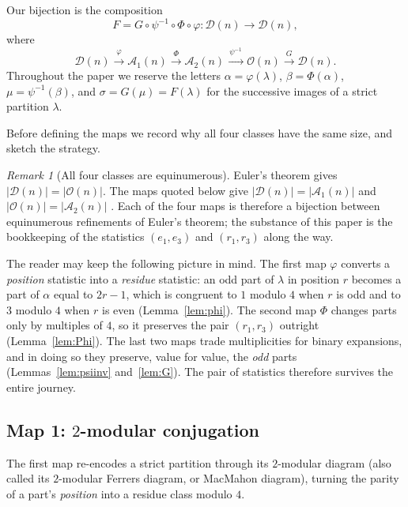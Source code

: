 \documentclass[11pt]{amsart}
\theoremstyle{definition}
\theoremstyle{remark}
\newtheorem{remark}[theorem]{Remark}
\newcommand{\D}{\mathcal D}
\newcommand{\Oparts}{\mathcal O}
\newcommand{\Aone}{\mathcal A_1}
\newcommand{\Atwo}{\mathcal A_2}
\begin{document}
Our bijection is the composition
\[
   F=G\circ \psi^{-1}\circ \Phi\circ \varphi:
   \D(n)\longrightarrow \D(n),
\]
where
\[
   \D(n)\xrightarrow{\ \varphi\ }\Aone(n)
        \xrightarrow{\ \Phi\ }\Atwo(n)
        \xrightarrow{\ \psi^{-1}\ }\Oparts(n)
        \xrightarrow{\ G\ }\D(n).
\]
Throughout the paper we reserve the letters $\alpha=\varphi(\lambda)$, $\beta=\Phi(\alpha)$, $\mu=\psi^{-1}(\beta)$, and $\sigma=G(\mu)=F(\lambda)$ for the successive images of a strict partition $\lambda$.

Before defining the maps we record why all four classes have the same size, and sketch the strategy.

\begin{remark}[All four classes are equinumerous]\label{rem:euler}
Euler's theorem gives $|\D(n)|=|\Oparts(n)|$. The maps quoted below give $|\D(n)|=|\Aone(n)|$ \cite[Lemma 2.2]{CGJL} and $|\Oparts(n)|=|\Atwo(n)|$ \cite[Lemma 2.3]{CGJL}. Each of the four maps is therefore a bijection between equinumerous refinements of Euler's theorem; the substance of this paper is the bookkeeping of the statistics $(e_1,e_3)$ and $(r_1,r_3)$ along the way.
\end{remark}

The reader may keep the following picture in mind. The first map $\varphi$ converts a \emph{position} statistic into a \emph{residue} statistic: an odd part of $\lambda$ in position $r$ becomes a part of $\alpha$ equal to $2r-1$, which is congruent to $1$ modulo $4$ when $r$ is odd and to $3$ modulo $4$ when $r$ is even (Lemma~\ref{lem:phi}). The second map $\Phi$ changes parts only by multiples of $4$, so it preserves the pair $(r_1,r_3)$ outright (Lemma~\ref{lem:Phi}). The last two maps trade multiplicities for binary expansions, and in doing so they preserve, value for value, the \emph{odd} parts (Lemmas~\ref{lem:psiinv} and~\ref{lem:G}). The pair of statistics therefore survives the entire journey.

\subsection{Map 1: \texorpdfstring{$2$}{2}-modular conjugation}\label{sec:map1}

The first map re-encodes a strict partition through its $2$-modular diagram (also called its $2$-modular Ferrers diagram, or MacMahon diagram), turning the parity of a part's \emph{position} into a residue class modulo $4$.
\end{document}
